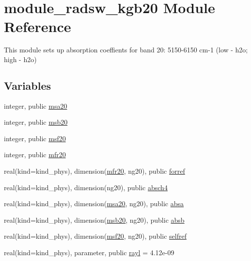 \hypertarget{namespacemodule__radsw__kgb20}{}\section{module\+\_\+radsw\+\_\+kgb20 Module Reference}
\label{namespacemodule__radsw__kgb20}


This module sets up absorption coeffients for band 20\+: 5150-\/6150 cm-\/1 (low -\/ h2o; high -\/ h2o)  


\subsection*{Variables}
\begin{DoxyCompactItemize}
\item 
integer, public \hyperlink{namespacemodule__radsw__kgb20_aadf199a3d453192a891b575d9adf8608}{msa20}
\item 
integer, public \hyperlink{namespacemodule__radsw__kgb20_a385f5b8c61ed1de7aa3bbb6bd65f522f}{msb20}
\item 
integer, public \hyperlink{namespacemodule__radsw__kgb20_a925dc2da02eef4edcf000a14525a7c7e}{msf20}
\item 
integer, public \hyperlink{namespacemodule__radsw__kgb20_a9c7964eeb3acb4a11757fce977b73022}{mfr20}
\item 
real(kind=kind\+\_\+phys), dimension(\hyperlink{namespacemodule__radsw__kgb20_a9c7964eeb3acb4a11757fce977b73022}{mfr20}, ng20), public \hyperlink{namespacemodule__radsw__kgb20_a3a660a7564064ca9997af9f95a5293b9}{forref}
\item 
real(kind=kind\+\_\+phys), dimension(ng20), public \hyperlink{namespacemodule__radsw__kgb20_a1757aee0ec8211f84e2c9334cc9b0f9d}{absch4}
\item 
real(kind=kind\+\_\+phys), dimension(\hyperlink{namespacemodule__radsw__kgb20_aadf199a3d453192a891b575d9adf8608}{msa20}, ng20), public \hyperlink{namespacemodule__radsw__kgb20_a405eabf194b1216dd083c2344e80f5b4}{absa}
\item 
real(kind=kind\+\_\+phys), dimension(\hyperlink{namespacemodule__radsw__kgb20_a385f5b8c61ed1de7aa3bbb6bd65f522f}{msb20}, ng20), public \hyperlink{namespacemodule__radsw__kgb20_af5b135f82f34831e86a12f726cbe47ad}{absb}
\item 
real(kind=kind\+\_\+phys), dimension(\hyperlink{namespacemodule__radsw__kgb20_a925dc2da02eef4edcf000a14525a7c7e}{msf20}, ng20), public \hyperlink{namespacemodule__radsw__kgb20_aa3853af5e29277f9ed2bdd397cab5029}{selfref}
\item 
real(kind=kind\+\_\+phys), parameter, public \hyperlink{namespacemodule__radsw__kgb20_a6a00db6ce81c299d44ef5eadc1fe3b5b}{rayl} = 4.\+12e-\/09
\end{DoxyCompactItemize}


